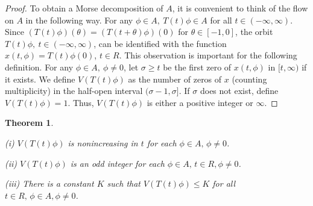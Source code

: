 \documentclass{surv-l}
\theoremstyle{plain}
\newtheorem{theorem}{Theorem}[section]
\theoremstyle{definition}
\numberwithin{equation}{section}
\numberwithin{figure}{chapter}
\begin{document}
\begin{proof}
To obtain a Morse decomposition of $A$, it is convenient to think of the flow on $A$ in the following way. For any $\phi \in A,\ T(t)\phi\in A$ for all $t\in(-\infty, \infty)$. Since $(T(t)\phi)(\theta)=(T(t+\theta)\phi)(0)$ for $\theta\in[-1,0]$, the orbit $ T(t)\phi,\ t\in(-\infty, \infty)$, can be identified with the function $x(t, \phi)=T(t)\phi(0)$, $t\in R$. This observation is important for the following definition. For any $\phi\in A,\ \phi \neq 0$, let $\sigma\geq t$ be the first zero of $x(t, \phi)$ in $[t, \infty)$ if it exists. We define $V(T(t)\phi)$ as the number of zeros of $x$ (counting multiplicity) in the half-open interval $(\sigma-1, \sigma]$. If $\sigma$ does not exist, define $V(T(t)\phi)=1$. Thus, $V(T(t)\phi)$ is either a positive integer or $\infty$.
\end{proof}

\begin{theorem}\label{thm4.1.9}\

{\rm (i)} $V(T(t)\phi)$ is nonincreasing in $t$ for each $\phi \in A,\, \phi\neq 0$.

{\rm (ii)} $V(T(t)\phi)$ is an odd integer for each $\phi\in A,\,t\in R,\phi\neq 0$.

{\rm (iii)} There is a constant $K$ such that $V(T(t)\phi)\leq K$ for all $t\in R,\,\phi \in A,\phi \neq 0$.
\end{theorem}
\end{document}
